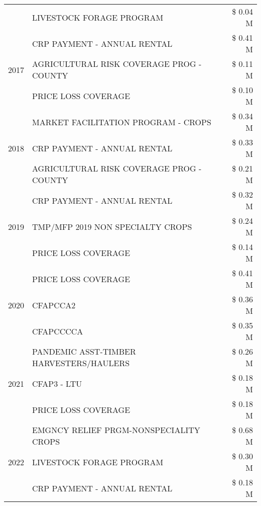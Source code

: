 \begin{tabular}{llr}
 & LIVESTOCK FORAGE PROGRAM & \$ 0.04 M \\
\cline{1-3}
\multirow[t]{3}{*}{2017} & CRP PAYMENT - ANNUAL RENTAL & \$ 0.41 M \\
 & AGRICULTURAL RISK COVERAGE PROG - COUNTY & \$ 0.11 M \\
 & PRICE LOSS COVERAGE & \$ 0.10 M \\
\cline{1-3}
\multirow[t]{3}{*}{2018} & MARKET FACILITATION PROGRAM - CROPS & \$ 0.34 M \\
 & CRP PAYMENT - ANNUAL RENTAL & \$ 0.33 M \\
 & AGRICULTURAL RISK COVERAGE PROG - COUNTY & \$ 0.21 M \\
\cline{1-3}
\multirow[t]{3}{*}{2019} & CRP PAYMENT - ANNUAL RENTAL & \$ 0.32 M \\
 & TMP/MFP 2019 NON SPECIALTY CROPS & \$ 0.24 M \\
 & PRICE LOSS COVERAGE & \$ 0.14 M \\
\cline{1-3}
\multirow[t]{3}{*}{2020} & PRICE LOSS COVERAGE & \$ 0.41 M \\
 & CFAPCCA2 & \$ 0.36 M \\
 & CFAPCCCCA & \$ 0.35 M \\
\cline{1-3}
\multirow[t]{3}{*}{2021} & PANDEMIC ASST-TIMBER HARVESTERS/HAULERS & \$ 0.26 M \\
 & CFAP3 - LTU & \$ 0.18 M \\
 & PRICE LOSS COVERAGE & \$ 0.18 M \\
\cline{1-3}
\multirow[t]{3}{*}{2022} & EMGNCY RELIEF PRGM-NONSPECIALITY CROPS & \$ 0.68 M \\
 & LIVESTOCK FORAGE PROGRAM & \$ 0.30 M \\
 & CRP PAYMENT - ANNUAL RENTAL & \$ 0.18 M \\
\cline{1-3}
\bottomrule
\end{tabular}
